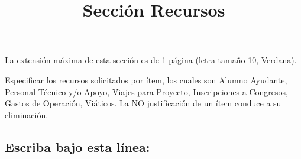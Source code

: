 \documentclass[10pt,prl]{revtex4}
\begin{document}
\title{Secci\'on Recursos}
\maketitle

La extensi\'on m\'axima de esta secci\'on es de 1 p\'agina (letra tama\~no 10, Verdana).

Especificar los recursos solicitados por \'item, los cuales son Alumno Ayudante, Personal T\'ecnico y/o Apoyo, Viajes para Proyecto, Inscripciones a Congresos, Gastos de Operaci\'on, Vi\'aticos. La NO justificaci\'on de un \'item conduce a su eliminaci\'on.

\maketitle
\subsection{Escriba bajo esta l\'inea:}
\end{document}
